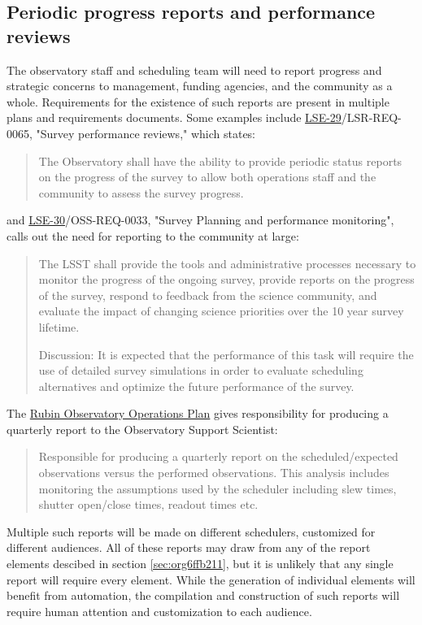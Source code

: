 \subsection{Periodic progress reports and performance reviews}
\label{sec:orgdb4477f}
The observatory staff and scheduling team will need to report progress and strategic concerns to management, funding agencies, and the community as a whole. Requirements for the existence of such reports are present in multiple plans and requirements documents. Some examples include \href{https://ls.st/lse-29}{LSE-29}/LSR-REQ-0065, "Survey performance reviews," which states:
\begin{quote}
The Observatory shall have the ability to provide periodic status reports on the progress of the survey to allow both operations staff and the community to assess the survey progress.
\end{quote}
and \href{https://ls.st/lse-30}{LSE-30}/OSS-REQ-0033, "Survey Planning and performance monitoring", calls out the need for reporting to the community at large:
\begin{quote}
The LSST shall provide the tools and administrative processes necessary to monitor the progress of the ongoing survey, provide reports on the progress of the survey, respond to feedback from the science community, and evaluate the impact of changing science priorities over the 10 year survey lifetime.

Discussion: It is expected that the performance of this task will require the use of detailed survey simulations in order to evaluate scheduling alternatives and optimize the future performance of the survey.
\end{quote}

The \href{https://docushare.lsst.org/docushare/dsweb/Get/Document-36797/Rubin\%20Observatory\%20Operations\%20Plan\%20April\%202020.pdf}{Rubin Observatory Operations Plan} gives responsibility for producing a quarterly report to the Observatory Support Scientist:
\begin{quote}
Responsible for producing a quarterly report on the scheduled/expected observations versus the performed observations. This analysis includes monitoring the assumptions used by the scheduler including slew times, shutter open/close times, readout times etc. 
\end{quote}

Multiple such reports will be made on different schedulers, customized for different audiences.
All of these reports may draw from any of the report elements descibed in section \ref{sec:org6ffb211}, but it is unlikely that any single report will require every element.
While the generation of individual elements will benefit from automation, the compilation and construction of such reports will require human attention and customization to each audience.

